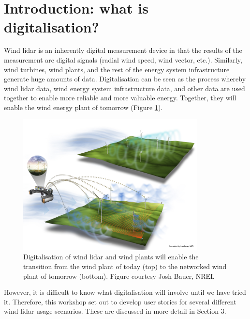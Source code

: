 \section{Introduction: what is digitalisation?}

Wind lidar is an inherently digital measurement device in that the results of the measurement are digital signals (radial wind speed, wind vector, etc.). Similarly, wind turbines, wind plants, and the rest of the energy system infrastructure generate huge amounts of data. Digitalisation can be seen as the process whereby wind lidar data, wind energy system infrastructure data, and other data are used together to enable more reliable and more valuable energy. Together, they will enable the wind energy plant of tomorrow (Figure \ref{fig:digital_windplant}).

\begin{figure}[!hbt]
    \centering
    \includegraphics[width=0.85\textwidth]{figures/NRELTP-5000-68123-Fig4.png}
    \caption{Digitalisation of wind lidar and wind plants will enable the transition from the wind plant of today (top) to the networked wind plant of tomorrow (bottom). Figure courtesy Josh Bauer, NREL}
    \label{fig:digital_windplant}
\end{figure}

However, it is difficult to know what digitalisation will involve until we have tried it. Therefore, this workshop set out to develop user stories for several different wind lidar usage scenarios. These are discussed in more detail in Section 3.